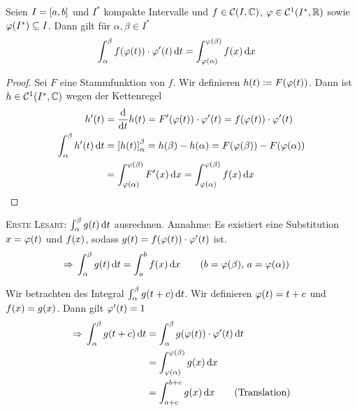 \begin{satz}[Substitutionsregel] %
    Seien $I=\left[a,b\right]$ und $I^{*}$ kompakte Intervalle und $f\in\mC\of{I, \C}$, $\varphi\in\mC^{1}\of{I^{*}, \R}$ sowie $\varphi\of{I^{*}}\subseteq I$. Dann gilt für $\alpha, \beta \in I^{*}$
    \begin{align*}
        \int_{\alpha}^{\beta} f\of{\varphi\of{t}}\cdot\varphi'\of{t} \dif t &= \int_{\varphi\of{\alpha}}^{\varphi\of{\beta}} f\of{x} \dif x
    \end{align*}
    \begin{proof}
        Sei $F$ eine Stammfunktion von $f$. Wir definieren $h\of{t}\coloneqq F\of{\varphi\of{t}}$. Dann ist $h\in\mC^{1}\of{I^{*}, \C}$ wegen der Kettenregel
        \begin{align*}
            h'\of{t} &= \frac{\dif}{\dif t} h\of{t} = F'\of{\varphi\of{t}}\cdot\varphi'\of{t} = f\of{\varphi\of{t}}\cdot\varphi'\of{t}\\
            \int_{\alpha}^{\beta} h'\of{t} \dif t &= \interv{h\of{t}}_{\alpha}^{\beta} = h\of{\beta}-h\of{\alpha} = F\of{\varphi\of{\beta}} - F\of{\varphi\of{\alpha}}\\
            &= \int_{\varphi\of{\alpha}}^{\varphi\of{\beta}} F'\of{x} \dif x = \int_{\varphi\of{\alpha}}^{\varphi\of{\beta}} f\of{x} \dif x\qedhere
        \end{align*}
    \end{proof}
    \noindent \textsc{Erste Lesart:} $ \int_{\alpha}^{\beta} g\of{t} \dif t$ ausrechnen. Annahme: Es existiert eine Substitution $x=\varphi\of{t}$ und $f\of{x}$, sodass $g\of{t} = f\of{\varphi\of{t}}\cdot\varphi'\of{t}$ ist.
    \begin{align*}
        \impl \int_{\alpha}^{\beta} g\of{t} \dif t &= \int_{a}^{b} f\of{x} \dif x\tag{$b=\varphi\of{\beta}$, $a = \varphi\of{\alpha}$}
    \end{align*}
\end{satz}

\begin{beispiel}
    Wir betrachten des Integral $\int_{\alpha}^{\beta} g\of{t+c} \dif t$. Wir definieren $\varphi\of{t} = t+c$ und $f\of{x} = g\of{x}$. Dann gilt $\varphi'\of{t} = 1$
    \begin{align*}
        \impl \int_{\alpha}^{\beta} g\of{t+c} \dif t &= \int_{\alpha}^{\beta} g\of{\varphi\of{t}}\cdot\varphi'\of{t} \dif t\\
        &= \int_{\varphi\of{\alpha}}^{\varphi\of{\beta}} g\of{x} \dif x\\
        &= \int_{a+c}^{b+c} g\of{x} \dif x\tag{Translation}
    \end{align*}
\end{beispiel}

